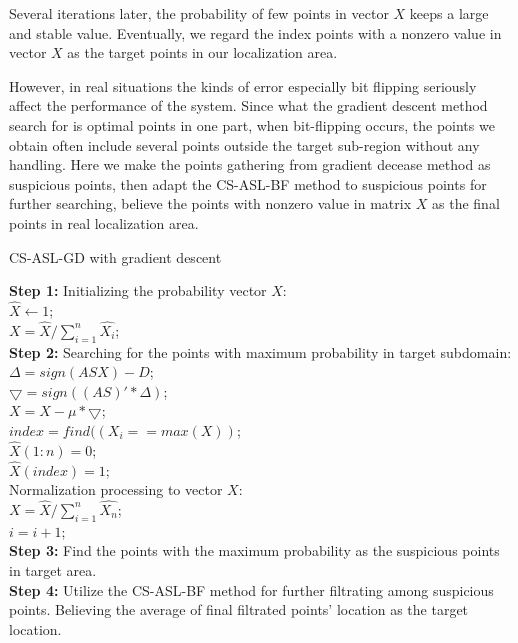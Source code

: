  Several iterations later,  the probability of few points in vector $X$ keeps a large and stable value. Eventually, we regard the index points with a nonzero  value in  vector $X$ as the target points in our localization area.
 
 However, in real situations the kinds of error especially bit flipping seriously affect the performance of the system. Since what the gradient descent method search for is optimal points in one part, when bit-flipping occurs, the points we obtain often include several points outside the target sub-region without any handling. Here we  make the points gathering from gradient decease method as suspicious points, then adapt the CS-ASL-BF method to suspicious points for further searching, believe the points with nonzero value in matrix $X$ as the final points in real localization area.
 
 \begin{algorithm}
\caption{CS-ASL-GD with gradient descent}

\textbf{Step 1:} Initializing the probability vector $X$:\\
$\hat{X} \leftarrow 1$;\\
$X=\hat{X}/\sum\limits_{i=1}^n\hat{X_i}$;\\
\textbf{Step 2:} Searching for the points with maximum probability in target subdomain: \\
{
     $\varDelta=sign(ASX)-D$;\\
     $\bigtriangledown=sign((AS)'*\varDelta)$;\\
     $X=X-\mu*\bigtriangledown$;\\
     $index=find((X_i==max(X))$;\\
     $\hat{X}(1:n)=0$;\\
     $\hat{X}(index)=1$;\\
     Normalization processing to vector $X$:\\
     $X=\hat{X}/\sum\limits_{i=1}^n\hat{X_n}$;\\
     $i=i+1$;\\
}
\textbf{Step 3:} Find the points with the maximum probability as the suspicious points in target area. \\
\textbf{Step 4:} Utilize the CS-ASL-BF method for further filtrating among suspicious points. Believing the average of final filtrated points' location as the target location.
\end{algorithm}

